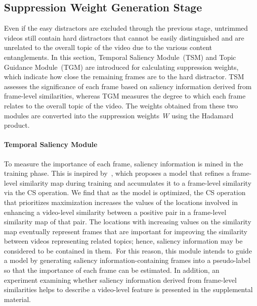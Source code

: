 \documentclass[10pt,twocolumn,letterpaper]{article}
\begin{document}
        
    \subsection{Suppression Weight Generation Stage}
        
        Even if the easy distractors are excluded through the previous stage, untrimmed videos still contain hard distractors that cannot be easily distinguished and are unrelated to the overall topic of the video due to the various content entanglements. In this section, Temporal Saliency Module~(TSM) and Topic Guidance Module~(TGM) are introduced for calculating suppression weights, which indicate how close the remaining frames are to the hard distractor. TSM assesses the significance of each frame based on saliency information derived from frame-level similarities, whereas TGM measures the degree to which each frame relates to the overall topic of the video. The weights obtained from these two modules are converted into the suppression weights~$W$ using the Hadamard product.
        \vspace{-2mm}
        
        \paragraph{Temporal Saliency Module \\} 
            To measure the importance of each frame, saliency information is mined in the training phase. This is inspired by~\cite{kordopatis2019visil}, which proposes a model that refines a frame-level similarity map during training and accumulates it to a frame-level similarity via the CS operation. We find that as the model is optimized, the CS operation that prioritizes maximization increases the values of the locations involved in enhancing a video-level similarity between a positive pair in a frame-level similarity map of that pair. The locations with increasing values on the similarity map eventually represent frames that are important for improving the similarity between videos representing related topics; hence, saliency information may be considered to be contained in them. For this reason, this module intends to guide a model by generating saliency information-containing frames into a pseudo-label so that the importance of each frame can be estimated. In addition, an experiment examining whether saliency information derived from frame-level similarities helps to describe a video-level feature is presented in the supplemental material.
\end{document}

